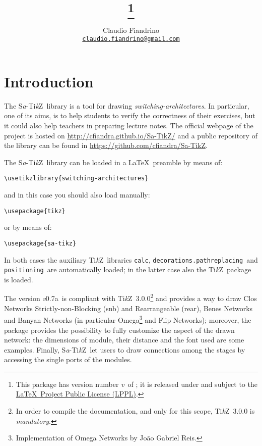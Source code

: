 \documentclass{ltxdoc}
\title{\saTikZ\footnote{This package has version number \textit{v}\version\ of \versiondate; it is released under and subject to the \href{http://www.latex-project.org/lppl/}{\LaTeX\ Project Public License (LPPL)}.}}
\author{Claudio Fiandrino \\ \small\href{mailto:claudio.fiandrino@gmail.com}{\texttt{claudio.fiandrino@gmail.com}}}
\date{\versiondate}
\newcommand\Tikz{Ti\textit kZ}
\newcommand{\saTikZ}{S\textit{a}-\Tikz}
\newcommand{\version}{0.7a}
\begin{document}
\maketitle
\tableofcontents

\section*{Introduction}
The \saTikZ\ library is a tool for drawing \emph{switching-architectures}. In particular, one of its aims, is to help students to verify the correctness of their exercises, but it could also help teachers in preparing lecture notes. The official webpage of the project is hosted on \href{http://cfiandra.github.io/Sa-TikZ/}{http://cfiandra.github.io/Sa-TikZ/} and a public  repository of the library can be found in \href{https://github.com/cfiandra/Sa-TikZ}{https://github.com/cfiandra/Sa-TikZ}.

The \saTikZ\ library can be loaded in a \LaTeX\ preamble by means of:
\begin{flushleft}
\verb|\usetikzlibrary{|\bgroup\color{red!75!black}\verb|switching-architectures|\egroup\verb|}|
\end{flushleft}
and in this case you should also load manually:
\begin{flushleft}
\verb|\usepackage{|\bgroup\color{red!75!black}\verb|tikz|\egroup\verb|}|
\end{flushleft}
or by means of:
\begin{flushleft}
\verb|\usepackage{|\bgroup\color{red!75!black}\verb|sa-tikz|\egroup\verb|}|
\end{flushleft}
In both cases the auxiliary \Tikz\ libraries \bgroup\color{red!75!black}\verb|calc|\egroup{}, \bgroup\color{red!75!black}\verb|decorations.pathreplacing|\egroup\ and \bgroup\color{red!75!black}\verb|positioning|\egroup\ are automatically loaded; in the latter case also the \Tikz\ package is loaded.

The version \textit{v}\version\ is compliant with \Tikz\ 3.0.0\footnote{In order to compile the documentation, and only for this scope, \Tikz\ 3.0.0 is \emph{mandatory}.} and provides a way to draw Clos Networks Strictly-non-Blocking (snb) and Rearrangeable (rear), Benes Networks and Banyan Networks (in particular Omega\footnote{Implementation of Omega Networks by João Gabriel Reis.} and Flip Networks); moreover, the package provides the possibility to fully customize the aspect of the drawn network: the dimensions of module, their distance and the font used are some examples. Finally, \saTikZ\ let users to draw connections among the stages by accessing the single ports of the modules.
\end{document}
